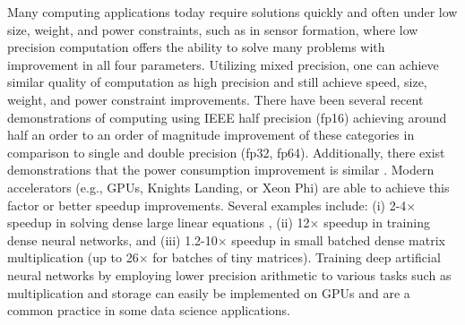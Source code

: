 \documentclass[review,onefignum,onetabnum]{siamart190516}
\begin{document}
Many computing applications today require solutions quickly and often under low size, weight, and power constraints, such as in sensor formation, where low precision computation offers the ability to solve many problems with improvement in all four parameters.
Utilizing mixed precision, one can achieve similar quality of computation as high precision and still achieve 
speed, size, weight, and power constraint improvements. 
There have been several recent demonstrations of computing using IEEE half precision (fp16) achieving around half an order to an order of magnitude improvement of these categories in comparison to single and double precision (fp32, fp64).
Additionally, there exist demonstrations that the power consumption improvement is similar
\cite{fagan2016powerwall}.
Modern accelerators (e.g., GPUs, Knights Landing, or Xeon Phi) are able to achieve this factor or better speedup improvements.
Several examples include:
(i)   2-4$\times$ speedup in solving dense large linear equations \cite{haidar2018iterative,haidar2019tensorcore},
(ii)  12$\times$ speedup in training dense neural networks,
and
(iii) 1.2-10$\times$ speedup in small batched dense matrix multiplication \cite{abdelfattah2019batched} (up to 26$\times$ for batches of tiny matrices).
Training deep artificial neural networks by employing lower precision arithmetic to various tasks such as multiplication \cite{Courbariaux2014Mult} and storage \cite{Courbariaux2014Storage} can easily be implemented on GPUs and are a common practice in some data science applications.\par
\end{document}
